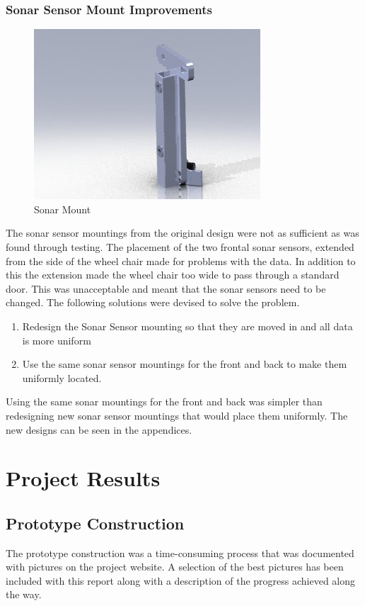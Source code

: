 \documentclass[oneside,final,a4paper]{report}
\begin{document}
\subsection{Sonar Sensor Mount Improvements}
\begin{figure}[hbt]
 \centering
 \includegraphics[scale=0.6]{FinalSonarMount3}
 \caption{Sonar Mount}
 \label{fig:sonar_mount}
\end{figure}
The sonar sensor mountings from the original design were not as sufficient as was found through testing. The placement of the two frontal sonar sensors, extended from the side of the wheel chair made for problems with the data. In addition to this the extension made the wheel chair too wide to pass through a standard door. This was unacceptable and meant that the sonar sensors need to be changed. The following solutions were devised to solve the problem.
\begin{enumerate}
\item Redesign the Sonar Sensor mounting so that they are moved in and all data is more uniform
\item Use the same sonar sensor mountings for the front and back to make them uniformly located.
\end{enumerate}
Using the same sonar mountings for the front and back was simpler than redesigning new sonar sensor mountings that would place them uniformly. The new designs can be seen in the appendices.


\chapter{Project Results}

\section{Prototype Construction}

The prototype construction was a time-consuming process that was documented with pictures on the project website. A selection of the best pictures has been included with this report along with a description of the progress achieved along the way.
\end{document}
